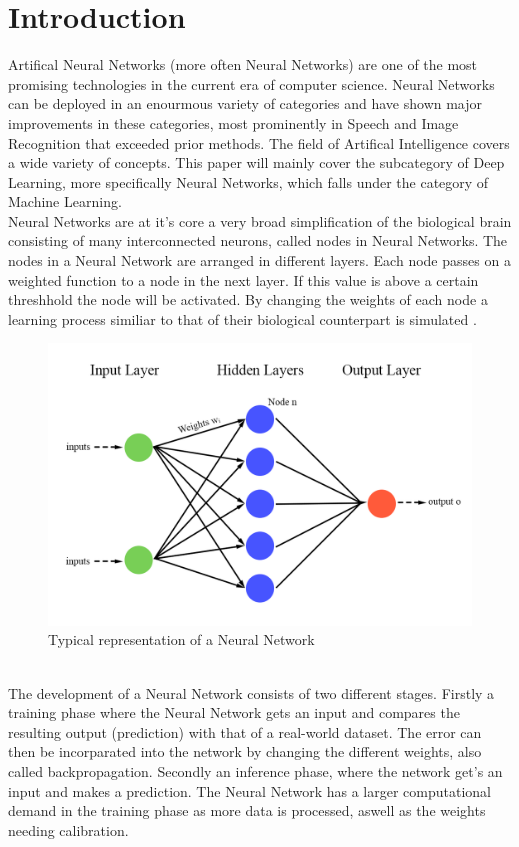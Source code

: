 \documentclass[conference]{IEEEtran}
\begin{document}
\section{Introduction}
Artifical Neural Networks (more often Neural Networks) are one of the most promising technologies in the current era of computer science. Neural Networks can be deployed in an enourmous variety of categories and have shown major improvements in these categories, most prominently in Speech and Image Recognition \cite{speech_recognition1} that exceeded prior methods. The field of Artifical Intelligence covers a wide variety of concepts. This paper will mainly cover the subcategory of Deep Learning, more specifically Neural Networks, which falls under the category of Machine Learning. 
\\
Neural Networks are at it's core a very broad simplification of the biological brain consisting of many interconnected neurons, called nodes in Neural Networks. The nodes in a Neural Network are  arranged in different layers. Each node passes on a weighted function to a node in the next layer. If this value is above a certain threshhold the node will be activated. By changing the weights of each node a learning process similiar to that of their biological counterpart is simulated \cite{nn_basics}.
\begin{figure}[h]
	\caption{Typical representation of a Neural Network}
	\centering
	\includegraphics[width=\linewidth]{pictures/neuralnetwork.png}
\end{figure}
\\
The development of a Neural Network consists of two different stages. Firstly a training phase where the Neural Network gets an input and compares the resulting output (prediction) with that of a real-world dataset. The error can then be incorparated into the network by changing the different weights, also called backpropagation. Secondly an inference phase, where the network get's an input and makes a prediction. The Neural Network has a larger computational demand in the training phase as more data is processed, aswell as the weights needing calibration.
\end{document}
